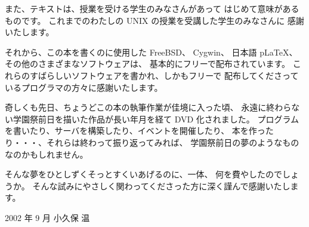 \bigskip

また、テキストは、授業を受ける学生のみなさんがあって
はじめて意味があるものです。
これまでのわたしの UNIX の授業を受講した学生のみなさんに
感謝いたします。

\bigskip

それから、この本を書くのに使用した FreeBSD、 Cygwin、
日本語 p\LaTeX、その他のさまざまなソフトウェアは、
基本的にフリーで配布されています。
これらのすばらしいソフトウェアを書かれ、しかもフリーで
配布してくださっているプログラマの方々に感謝いたします。

\bigskip

奇しくも先日、ちょうどこの本の執筆作業が佳境に入った頃、
永遠に終わらない学園祭前日を描いた作品が長い年月を経て DVD 化されました。
プログラムを書いたり、サーバを構築したり、イベントを開催したり、
本を作ったり・・・、それらは終わって振り返ってみれば、
学園祭前日の夢のようなものなのかもしれません。

そんな夢をひとしずくそっとすくいあげるのに、一体、
何を費やしたのでしょうか。
そんな試みにやさしく関わってくださった方に深く謹んで感謝いたします。

\begin{flushright}
2002 年 9 月  小久保 温
\end{flushright}

